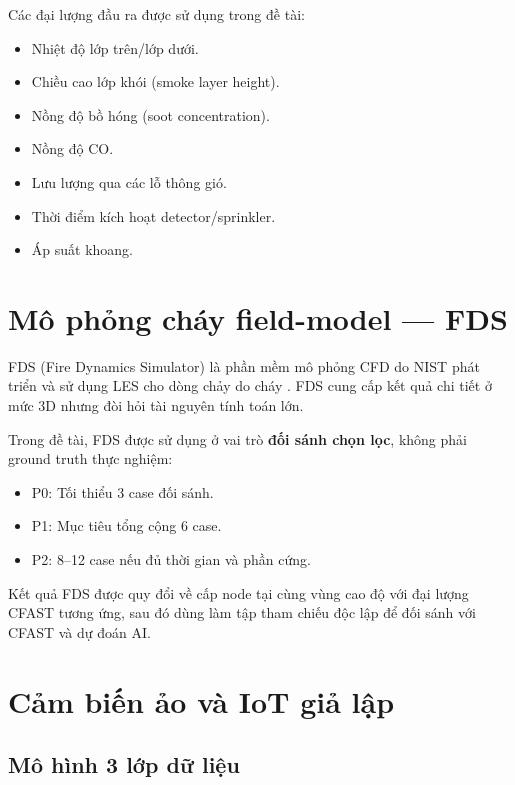 Các đại lượng đầu ra được sử dụng trong đề tài:
\begin{itemize}
  \item Nhiệt độ lớp trên/lớp dưới.
  \item Chiều cao lớp khói (smoke layer height).
  \item Nồng độ bồ hóng (soot concentration).
  \item Nồng độ CO.
  \item Lưu lượng qua các lỗ thông gió.
  \item Thời điểm kích hoạt detector/sprinkler.
  \item Áp suất khoang.
\end{itemize}

\section{Mô phỏng cháy field-model — FDS}
\label{sec:fds}

FDS (Fire Dynamics Simulator) là phần mềm mô phỏng CFD do NIST phát triển và sử dụng LES cho dòng chảy do cháy \cite{fds_guide,fds_tech}. FDS cung cấp kết quả chi tiết ở mức 3D nhưng đòi hỏi tài nguyên tính toán lớn.

Trong đề tài, FDS được sử dụng ở vai trò \textbf{đối sánh chọn lọc}, không phải ground truth thực nghiệm:
\begin{itemize}
  \item P0: Tối thiểu 3 case đối sánh.
  \item P1: Mục tiêu tổng cộng 6 case.
  \item P2: 8--12 case nếu đủ thời gian và phần cứng.
\end{itemize}

Kết quả FDS được quy đổi về cấp node tại cùng vùng cao độ với đại lượng CFAST tương ứng, sau đó dùng làm tập tham chiếu độc lập để đối sánh với CFAST và dự đoán AI.

\section{Cảm biến ảo và IoT giả lập}
\label{sec:virtualiot}

\subsection{Mô hình 3 lớp dữ liệu}


